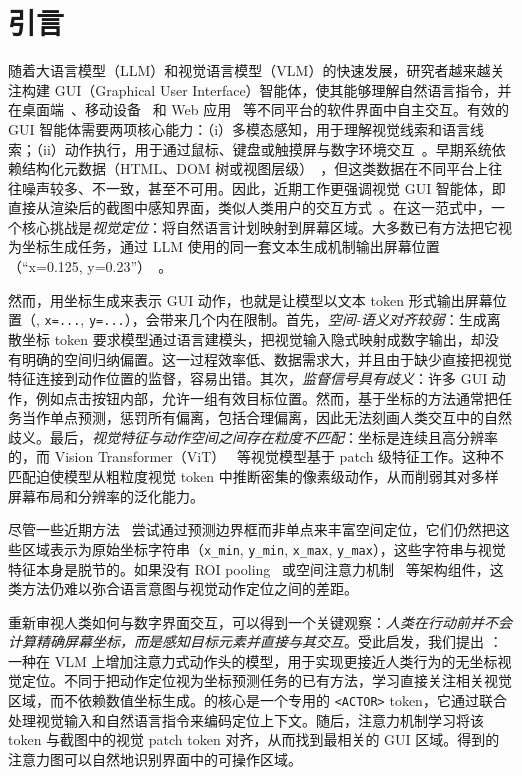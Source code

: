 \section{引言}

随着大语言模型（LLM）和视觉语言模型（VLM）的快速发展，研究者越来越关注构建 GUI（Graphical User Interface）智能体，使其能够理解自然语言指令，并在桌面端~\cite{zhang2024ufo, zhang2025ufo2}、移动设备~\cite{wang2024mobileagentautonomousmultimodalmobile} 和 Web 应用~\cite{zheng2024gpt} 等不同平台的软件界面中自主交互。有效的 GUI 智能体需要两项核心能力：（i）多模态感知，用于理解视觉线索和语言线索；（ii）动作执行，用于通过鼠标、键盘或触摸屏与数字环境交互~\cite{zhang2024large, wang2024large}。早期系统依赖结构化元数据（\eg HTML、DOM 树或视图层级）~\cite{zhang2024ufo}，但这类数据在不同平台上往往噪声较多、不一致，甚至不可用。因此，近期工作更强调视觉 GUI 智能体，即直接从渲染后的截图中感知界面，类似人类用户的交互方式~\cite{xu2024aguvis}。在这一范式中，一个核心挑战是\emph{视觉定位}：将自然语言计划映射到屏幕区域。大多数已有方法把它视为坐标生成任务，通过 LLM 使用的同一套文本生成机制输出屏幕位置（\eg ``x=0.125, y=0.23''）~\cite{gou2024navigating}。

然而，用坐标生成来表示 GUI 动作，也就是让模型以文本 token 形式输出屏幕位置（\eg, \texttt{x=...}, \texttt{y=...}），会带来几个内在限制。首先，\textit{空间-语义对齐较弱}：生成离散坐标 token 要求模型通过语言建模头，把视觉输入隐式映射成数字输出，却没有明确的空间归纳偏置。这一过程效率低、数据需求大，并且由于缺少直接把视觉特征连接到动作位置的监督，容易出错。其次，\textit{监督信号具有歧义}：许多 GUI 动作，例如点击按钮内部，允许一组有效目标位置。然而，基于坐标的方法通常把任务当作单点预测，惩罚所有偏离，包括合理偏离，因此无法刻画人类交互中的自然歧义。最后，\textit{视觉特征与动作空间之间存在粒度不匹配}：坐标是连续且高分辨率的，而 Vision Transformer（ViT）~\cite{dosovitskiy2021an} 等视觉模型基于 patch 级特征工作。这种不匹配迫使模型从粗粒度视觉 token 中推断密集的像素级动作，从而削弱其对多样屏幕布局和分辨率的泛化能力。

尽管一些近期方法~\cite{qin2025ui} 尝试通过预测边界框而非单点来丰富空间定位，它们仍然把这些区域表示为原始坐标字符串（\eg \texttt{x\_min}, \texttt{y\_min}, \texttt{x\_max}, \texttt{y\_max}），这些字符串与视觉特征本身是脱节的。如果没有 ROI pooling~\cite{sun2019roi} 或空间注意力机制~\cite{zhu2019empirical} 等架构组件，这类方法仍难以弥合语言意图与视觉动作定位之间的差距。

重新审视人类如何与数字界面交互，可以得到一个关键观察：\textit{人类在行动前并不会计算精确屏幕坐标，而是感知目标元素并直接与其交互}。受此启发，我们提出 \sys：一种在 VLM 上增加注意力式动作头的模型，用于实现更接近人类行为的无坐标视觉定位。不同于把动作定位视为坐标预测任务的已有方法，\sys 学习直接关注相关视觉区域，而不依赖数值坐标生成。\sys 的核心是一个专用的 \texttt{<ACTOR>} token，它通过联合处理视觉输入和自然语言指令来编码定位上下文。随后，注意力机制学习将该 token 与截图中的视觉 patch token 对齐，从而找到最相关的 GUI 区域。得到的注意力图可以自然地识别界面中的可操作区域。


